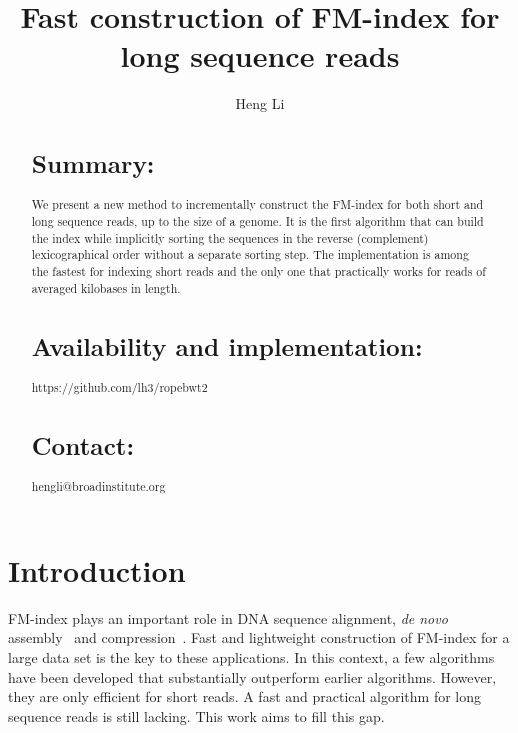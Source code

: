 \documentclass{bioinfo}
\begin{document}

\title[Constructing BWT]{Fast construction of FM-index for long sequence reads}

\author[Li]{Heng Li}

\address{Broad Institute, 7 Cambridge Center, Cambridge, MA 02142, USA}

\maketitle

\begin{abstract}
\section{Summary:} We present a new method to incrementally construct the
FM-index for both short and long sequence reads, up to the size of a genome.
It is the first algorithm that can build the index while implicitly sorting the
sequences in the reverse (complement) lexicographical order without a separate
sorting step. The implementation is among the fastest for indexing short reads
and the only one that practically works for reads of averaged kilobases in
length.

\section{Availability and implementation:} https://github.com/lh3/ropebwt2

\section{Contact:} hengli@broadinstitute.org
\end{abstract}

\section{Introduction}

FM-index plays an important role in DNA sequence alignment, {\it de novo}
assembly~\citep{Simpson:2012aa} and compression~\citep{Cox:2012ly}. Fast
and lightweight construction of FM-index for a large data set is the key to
these applications. In this context, a few
algorithms~\citep{DBLP:journals/tcs/BauerCR13,DBLP:journals/corr/LiuLL14} have
been developed that substantially outperform earlier algorithms.  However, they
are only efficient for short reads. A fast and practical algorithm for long
sequence reads is still lacking. This work aims to fill this gap.
\end{document}
